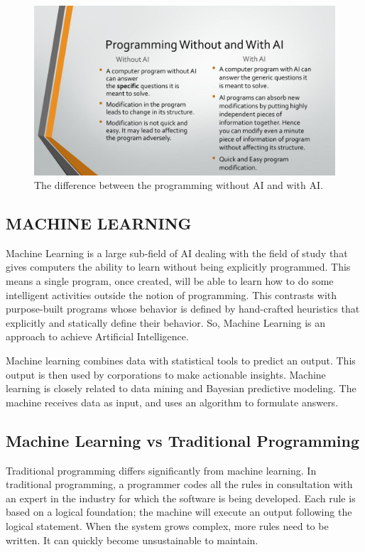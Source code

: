 \documentclass{article}
\begin{document}
\begin{figure}[h]
\centering
\includegraphics[width=1\textwidth]{image1.jpg}
\caption{The difference between the programming without AI and with AI\cite{Deshai_2017}.}
\label{fig: the difference between programming without AI and with AI.}
\end{figure}

\subsection{MACHINE LEARNING}
Machine Learning is a large sub-field of AI dealing with the field of study that gives computers the ability to learn without being explicitly programmed. This means a single program, once created, will be able to learn how to do some intelligent activities outside the notion of programming. This contrasts with purpose-built programs whose behavior is defined by hand-crafted heuristics that explicitly and statically define their behavior. So, Machine Learning is an approach to achieve Artificial Intelligence.

Machine learning combines data with statistical tools to predict an output. This output is then used by corporations to make actionable insights. Machine learning is closely related to data mining and Bayesian predictive modeling. The machine receives data as input, and uses an algorithm to formulate answers.

\subsection{Machine Learning vs Traditional Programming}
Traditional programming differs significantly from machine learning. In traditional programming, a programmer codes all the rules in consultation with an expert in the industry for which the software is being developed. Each rule is based on a logical foundation; the machine will execute an output following the logical statement. When the system grows complex, more rules need to be written. It can quickly become unsustainable to maintain.
\end{document}

